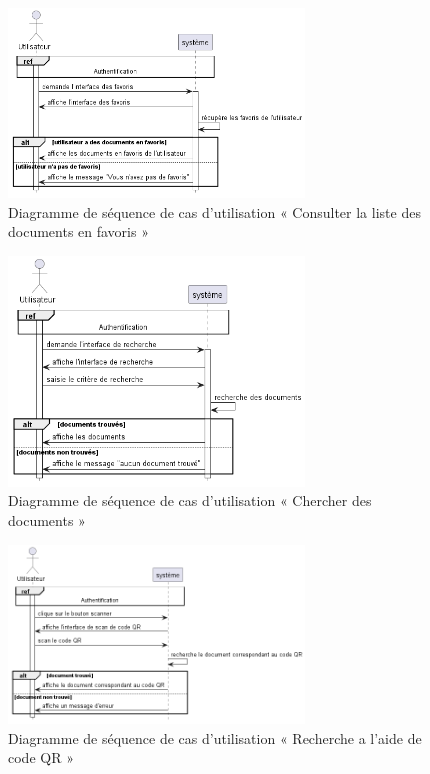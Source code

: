 \begin{figure}[H]
  \centering
  \includegraphics[width=0.7\textwidth]{out/diagrams/documents/favoris/favorit_document}
  \caption{Diagramme de séquence de cas d'utilisation « Consulter la liste des documents en favoris  »}
  \label{fig:sequence_favorit_document}
\end{figure}
\begin{figure}[H]
  \centering
  \includegraphics[width=0.7\textwidth]{out/diagrams/documents/chercher/charcher_document}
  \caption{Diagramme de séquence de cas d'utilisation « Chercher des documents  »}
  \label{fig:sequence_charcher_document}
\end{figure}
\begin{figure}[H]
  \centering
  \includegraphics[width=0.7\textwidth]{out/diagrams/documents/scan_qr/scan_qr}
  \caption{Diagramme de séquence de cas d'utilisation « Recherche a l'aide de code QR »}
  \label{fig:sequence_scan_qr}
\end{figure}

